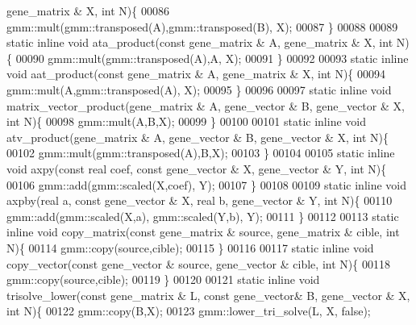 \begin{DoxyCode}
      gene\_matrix & X, \textcolor{keywordtype}{int} N)\{
00086     gmm::mult(gmm::transposed(A),gmm::transposed(B), X);
00087   \}
00088 
00089   \textcolor{keyword}{static} \textcolor{keyword}{inline} \textcolor{keywordtype}{void} ata\_product(\textcolor{keyword}{const} gene\_matrix & A, gene\_matrix & X, \textcolor{keywordtype}{int} N)\{
00090     gmm::mult(gmm::transposed(A),A, X);
00091   \}
00092 
00093   \textcolor{keyword}{static} \textcolor{keyword}{inline} \textcolor{keywordtype}{void} aat\_product(\textcolor{keyword}{const} gene\_matrix & A, gene\_matrix & X, \textcolor{keywordtype}{int} N)\{
00094     gmm::mult(A,gmm::transposed(A), X);
00095   \}
00096 
00097   \textcolor{keyword}{static} \textcolor{keyword}{inline} \textcolor{keywordtype}{void} matrix\_vector\_product(gene\_matrix & A, gene\_vector & B, gene\_vector & X, \textcolor{keywordtype}{int} N)\{
00098     gmm::mult(A,B,X);
00099   \}
00100 
00101   \textcolor{keyword}{static} \textcolor{keyword}{inline} \textcolor{keywordtype}{void} atv\_product(gene\_matrix & A, gene\_vector & B, gene\_vector & X, \textcolor{keywordtype}{int} N)\{
00102     gmm::mult(gmm::transposed(A),B,X);
00103   \}
00104 
00105   \textcolor{keyword}{static} \textcolor{keyword}{inline} \textcolor{keywordtype}{void} axpy(\textcolor{keyword}{const} real coef, \textcolor{keyword}{const} gene\_vector & X, gene\_vector & Y, \textcolor{keywordtype}{int} N)\{
00106     gmm::add(gmm::scaled(X,coef), Y);
00107   \}
00108 
00109   \textcolor{keyword}{static} \textcolor{keyword}{inline} \textcolor{keywordtype}{void} axpby(real a, \textcolor{keyword}{const} gene\_vector & X, real b, gene\_vector & Y, \textcolor{keywordtype}{int} N)\{
00110     gmm::add(gmm::scaled(X,a), gmm::scaled(Y,b), Y);
00111   \}
00112 
00113   \textcolor{keyword}{static} \textcolor{keyword}{inline} \textcolor{keywordtype}{void} copy\_matrix(\textcolor{keyword}{const} gene\_matrix & source, gene\_matrix & cible, \textcolor{keywordtype}{int} N)\{
00114     gmm::copy(source,cible);
00115   \}
00116 
00117   \textcolor{keyword}{static} \textcolor{keyword}{inline} \textcolor{keywordtype}{void} copy\_vector(\textcolor{keyword}{const} gene\_vector & source, gene\_vector & cible, \textcolor{keywordtype}{int} N)\{
00118     gmm::copy(source,cible);
00119   \}
00120 
00121   \textcolor{keyword}{static} \textcolor{keyword}{inline} \textcolor{keywordtype}{void} trisolve\_lower(\textcolor{keyword}{const} gene\_matrix & L, \textcolor{keyword}{const} gene\_vector& B, gene\_vector & X, \textcolor{keywordtype}{int} N)\{
00122     gmm::copy(B,X);
00123     gmm::lower\_tri\_solve(L, X, \textcolor{keyword}{false});

\end{DoxyCode}

